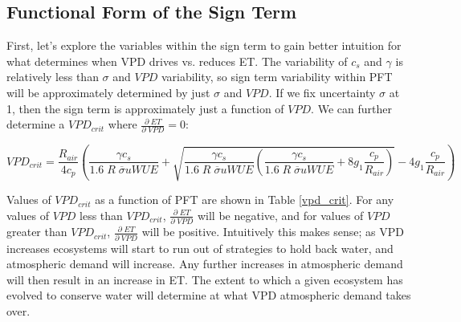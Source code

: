 \documentclass[draft,linenumbers]{agujournal}
\begin{document}
\subsection{Functional Form of the Sign Term}
\label{sign_func}
First, let's explore the variables within the sign term to gain better intuition for what determines when VPD drives vs. reduces ET. The variability of $c_s$ and $\gamma$ is relatively less than $\sigma$ and $VPD$ variability, so sign term variability within PFT will be approximately determined by just $\sigma$ and $VPD$. If we fix uncertainty $\sigma$ at 1, then the sign term is approximately just a function of $VPD$. We can further determine a $VPD_{crit}$ where $\frac{\partial \; ET}{\partial \; VPD} = 0$:

\begin{linenomath*}
  \begin{equation}
VPD_{crit} = \frac{R_{air}}{4 c_p} \left( \frac{\gamma c_s}{1.6\; R \; \overline{\sigma} uWUE} + \sqrt{\frac{\gamma c_s}{1.6\; R \; \overline{\sigma} uWUE}\left( \frac{\gamma c_s}{1.6\; R \; \overline{\sigma} uWUE} + 8 g_1 \frac{c_p}{R_{air}}\right)} - 4 g_1 \frac{c_p}{R_{air}} \right)
\label{vpd_min_et}
  \end{equation}
\end{linenomath*}

Values of $VPD_{crit}$ as a function of PFT are shown in Table \ref{vpd_crit}. For any values of $VPD$ less than $VPD_{crit}$, $\frac{\partial \; ET}{\partial \; VPD}$ will be negative, and for values of $VPD$ greater than $VPD_{crit}$, $\frac{\partial \; ET}{\partial \; VPD}$ will be positive. Intuitively this makes sense; as VPD increases ecosystems will start to run out of strategies to hold back water, and atmospheric demand will increase. Any further increases in atmospheric demand will then result in an increase in ET. The extent to which a given ecosystem has evolved to conserve water will determine at what VPD atmospheric demand takes over. 
\end{document}
